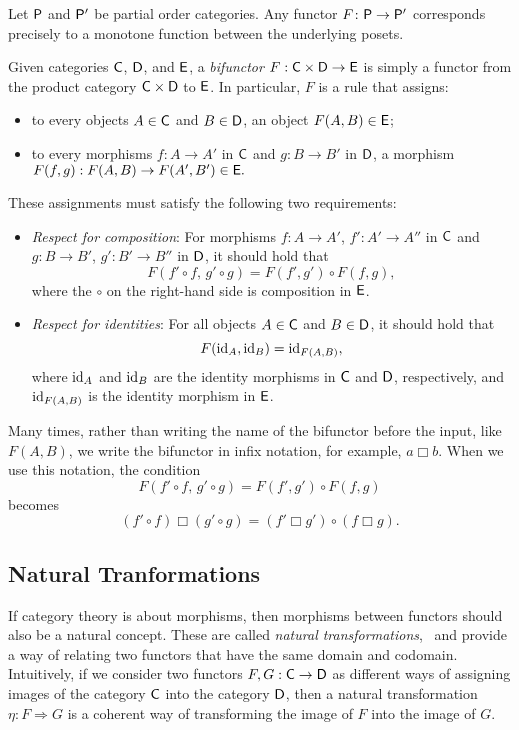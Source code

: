 \begin{example}
   Let $\mathsf{P}$ and $\mathsf{P}'$ be partial order categories. Any functor $F \colon \mathsf{P} \to \mathsf{P}'$ corresponds precisely to a monotone function between the underlying posets.
\end{example}


\begin{definition}
  Given categories $\mathsf{C}$, $\mathsf{D}$, and $\mathsf{E}$, a \emph{bifunctor}
$F : \mathsf{C} \times \mathsf{D} \to \mathsf{E}$
is simply a functor from the product category $\mathsf{C} \times \mathsf{D}$ to $\mathsf{E}$. In particular, $F$ is a rule that assigns:
\begin{itemize}
    \item to every objects $A \in \mathsf{C}$ and $B \in \mathsf{D}$, an object $F(A, B) \in \mathsf{E}$;
    \item to every morphisms $f : A \to A'$ in $\mathsf{C}$ and $g : B \to B'$ in $\mathsf{D}$, a morphism
    $F(f, g) : F(A, B) \to F(A', B') \in \mathsf{E}.$
\end{itemize}

These assignments must satisfy the following two requirements:

\begin{itemize}
    \item \emph{Respect for composition}:  
    For morphisms $f : A \to A'$, $f' : A' \to A''$ in $\mathsf{C}$ and $g : B \to B'$, $g' : B' \to B''$ in $\mathsf{D}$, it should hold that
    \[
    F(f' \circ f,\, g' \circ g) = F(f', g') \circ F(f, g),
    \]
    where the $\circ$ on the right-hand side is composition in $\mathsf{E}$.

    \item \emph{Respect for identities}:  
    For all objects $A \in \mathsf{C}$ and $B \in \mathsf{D}$, it should hold that
    \[
    F(\mathrm{id}_A, \mathrm{id}_B) = \mathrm{id}_{F(A, B)},
    \]
    where $\mathrm{id}_A$ and $\mathrm{id}_B$ are the identity morphisms in $\mathsf{C}$ and $\mathsf{D}$, respectively, and $\mathrm{id}_{F(A, B)}$ is the identity morphism in $\mathsf{E}$.
\end{itemize}

Many times, rather than writing the name of the bifunctor before the input, like $F(A, B)$, we write the bifunctor in infix notation, for example, $a \mathbin{\Box} b$. When we use this notation, the condition
\[
F(f' \circ f,\, g' \circ g) = F(f', g') \circ F(f, g)
\]
becomes
\[
(f' \circ f) \mathbin{\Box} (g' \circ g) = (f' \mathbin{\Box} g') \circ (f \mathbin{\Box} g).
\]
\end{definition}

\subsection{Natural Tranformations}
If category theory is about morphisms, then morphisms between functors should also be a natural concept. These are called \emph{natural transformations},  and provide a way of relating two functors that have the same domain and codomain. Intuitively, if we consider two functors $F, G : \mathsf{C} \to \mathsf{D}$ as different ways of assigning images of the category $\mathsf{C}$ into the category $\mathsf{D}$, then a natural transformation $\eta : F \Rightarrow G$ is a coherent way of transforming the image of $F$ into the image of $G$.


